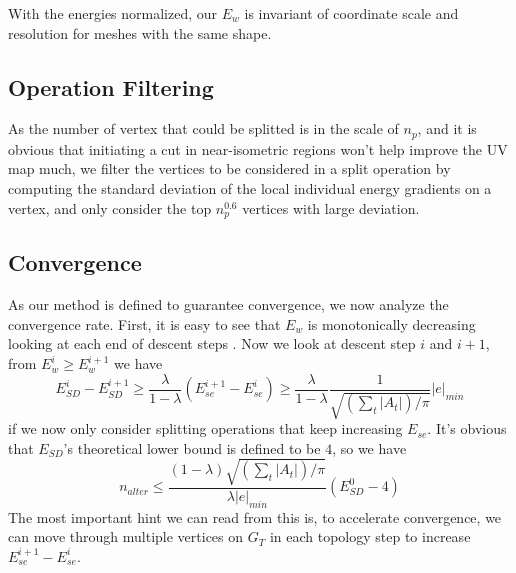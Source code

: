 With the energies normalized, our $E_w$ is invariant of coordinate scale and resolution for meshes with the same shape.





\subsection{Operation Filtering}
\label{sec:operationFiltering}
As the number of vertex that could be splitted is in the scale of $n_p$, and it is obvious that initiating a cut in near-isometric regions won't help improve the UV map much, we filter the vertices to be considered in a split operation by computing the standard deviation of the local individual energy gradients on a vertex, and only consider the top $n_p^{0.6}$ vertices with large deviation. 

\subsection{Convergence}
\label{sec:convergence}

As our method is defined to guarantee convergence, we now analyze the convergence rate. First, it is easy to see that $E_w$ is monotonically decreasing looking at each end of descent steps . Now we look at descent step $i$ and $i+1$, from $E^i_w \geq E^{i+1}_w$ we have
\[ E^i_{SD} - E^{i+1}_{SD} \geq \frac{\lambda}{1-\lambda} (E^{i+1}_{se} - E^i_{se}) \geq \frac{\lambda}{1-\lambda} \frac{1}{\sqrt{(\sum_t |A_t|)/\pi}} |e|_{min} \]
if we now only consider splitting operations that keep increasing $E_{se}$. It's obvious that $E_{SD}$'s theoretical lower bound is defined to be $4$, so we have
\[ n_{alter} \leq \frac{(1-\lambda)\sqrt{(\sum_t |A_t|)/\pi}}{\lambda|e|_{min}} (E^0_{SD} - 4) \]
The most important hint we can read from this is, to accelerate convergence, we can move through multiple vertices on $G_T$ in each topology step to increase $E^{i+1}_{se} - E^i_{se}$.

